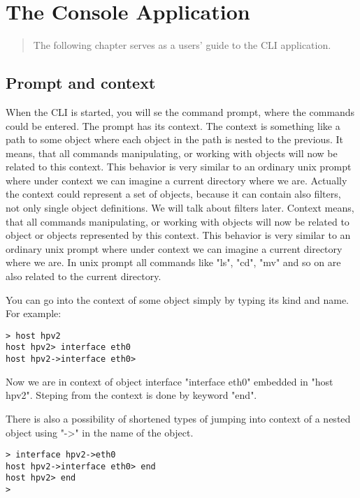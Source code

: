 \documentclass[deska]{subfiles}
\begin{document}
\chapter{The Console Application}
\label{sec:usage-cli}

\begin{abstract}
The following chapter serves as a users' guide to the CLI application.
\end{abstract}

\section{Prompt and context}

When the CLI is started, you will se the command prompt, where the commands could be entered. The prompt has its context.
The context is something like a path to some object where each object in the path is nested to the previous. 
It means, that all commands manipulating, or working with objects will now be related to this context. This behavior
is very similar to an ordinary unix prompt where under context we can imagine a current directory where we are. Actually the
context could represent a set of objects, because it can contain also filters, not only single object definitions.
We will talk about filters later. Context means, that all commands manipulating, or working with objects will now be related to
object or objects represented by this context. This behavior is very similar to an ordinary unix prompt where under context
we can imagine a current directory where we are. In unix prompt all commands like "ls", "cd", "mv" and so on are also related
to the current directory.

You can go into the context of some object simply by typing its kind and name. For example:

\begin{verbatim}
> host hpv2
host hpv2> interface eth0
host hpv2->interface eth0>
\end{verbatim}

Now we are in context of object interface "interface eth0" embedded in "host hpv2". Steping from the context is done by
keyword "end".

There is also a possibility of shortened types of jumping into context of a nested object using "->" in the name of the
object.

\begin{verbatim}
> interface hpv2->eth0
host hpv2->interface eth0> end
host hpv2> end
>
\end{verbatim}
\end{document}
